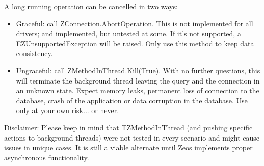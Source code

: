 \documentclass[a4paper,12pt,oneside]{article}
\begin{document}
A long running operation can be cancelled in two ways:
\begin{itemize}
  \item 
	  Graceful: call ZConnection.AbortOperation.
    This is not implemented for all drivers; and implemented, but untested at some.
		If it's not supported, a EZUnsupportedException will be raised.
		Only use this method to keep data consistency.
  \item
	  Ungraceful: call ZMethodInThread.Kill(True).
    With no further questions, this will terminate the background thread leaving the query and the connection in an unknown state.
		Expect memory leaks, permanent loss of connection to the database, crash of the application or data corruption in the database.
		Use only at your own risk... or never.
\end{itemize}

Disclaimer:
Please keep in mind that TZMethodInThread (and pushing specific actions to background threads) were not tested in every scenario and might cause issues in unique cases.
It is still a viable alternate until Zeos implements proper asynchronous functionality.
\end{document}
